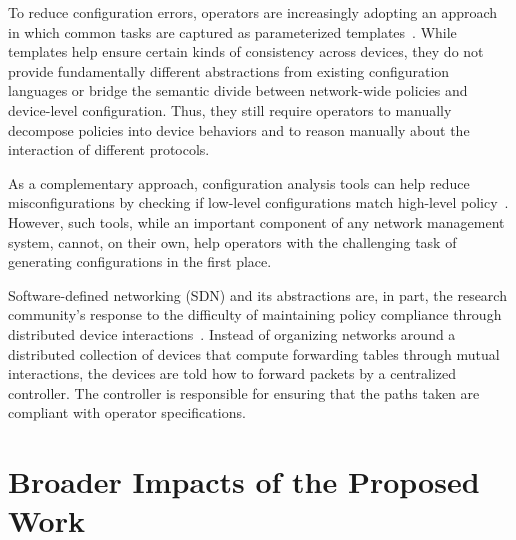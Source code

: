 To reduce configuration errors, operators are increasingly adopting an
approach in which common tasks are captured as parameterized templates~\cite{hatch,thwack}.
%
%
While templates help ensure certain kinds of consistency across devices,
they do not provide fundamentally different abstractions from existing configuration languages
or bridge the semantic divide between network-wide policies and device-level configuration.
Thus, they still require operators to
manually decompose policies into device behaviors and to reason manually about the interaction of different
protocols.

As a complementary approach, configuration analysis tools can help
reduce misconfigurations by checking if low-level configurations match
high-level policy~\cite{batfish,feamster+:rcc}. However, such tools, while
an important component of any network management system,
cannot, on their own, help operators with the challenging task of generating
configurations in the first place.


Software-defined networking (SDN) and its abstractions
are, in part, the research
community's response to the difficulty of maintaining policy
compliance through distributed device interactions~\cite{ethane}.
Instead of organizing networks around a distributed
collection of devices that compute forwarding tables through
mutual interactions, the devices are told how to
forward packets by a centralized controller. The controller is responsible for ensuring that the
paths taken are compliant with operator specifications.



\section{Broader Impacts of the Proposed Work}
\label{sec:impact}

